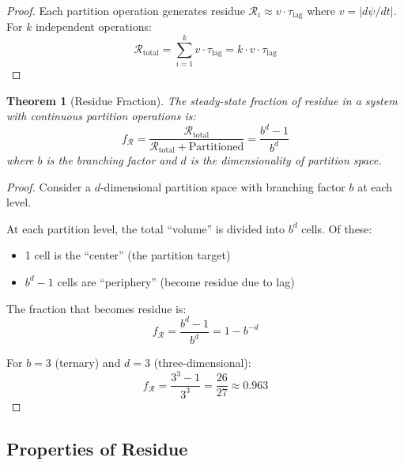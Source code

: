 \documentclass[twocolumn,10pt,a4paper]{article}
\newtheorem{theorem}{Theorem}[section]
\theoremstyle{definition}
\theoremstyle{remark}
\newcommand{\Residue}{\mathcal{R}}
\newcommand{\Lag}{\tau_{\mathrm{lag}}}
\begin{document}
\begin{proof}
Each partition operation generates residue $\Residue_i \approx v \cdot \Lag$ where $v = |d\psi/dt|$. For $k$ independent operations:
\begin{equation}
    \Residue_{\text{total}} = \sum_{i=1}^{k} v \cdot \Lag = k \cdot v \cdot \Lag
\end{equation}
\end{proof}

\begin{theorem}[Residue Fraction]
\label{thm:fraction}
The steady-state fraction of residue in a system with continuous partition operations is:
\begin{equation}
    f_{\Residue} = \frac{\Residue_{\text{total}}}{\Residue_{\text{total}} + \text{Partitioned}} = \frac{b^d - 1}{b^d}
\end{equation}
where $b$ is the branching factor and $d$ is the dimensionality of partition space.
\end{theorem}

\begin{proof}
Consider a $d$-dimensional partition space with branching factor $b$ at each level.

At each partition level, the total ``volume'' is divided into $b^d$ cells. Of these:
\begin{itemize}
    \item 1 cell is the ``center'' (the partition target)
    \item $b^d - 1$ cells are ``periphery'' (become residue due to lag)
\end{itemize}

The fraction that becomes residue is:
\begin{equation}
    f_{\Residue} = \frac{b^d - 1}{b^d} = 1 - b^{-d}
\end{equation}

For $b = 3$ (ternary) and $d = 3$ (three-dimensional):
\begin{equation}
    f_{\Residue} = \frac{3^3 - 1}{3^3} = \frac{26}{27} \approx 0.963
\end{equation}
\end{proof}

\subsection{Properties of Residue}
\end{document}
